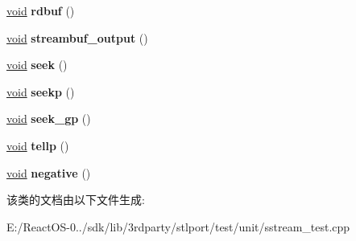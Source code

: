 \begin{DoxyCompactItemize}
\hyperlink{interfacevoid}{void} {\bfseries rdbuf} ()
\item 
\mbox{\label{class_sstream_test_ad43c3d1d6fd70e550c527dd25d0ab237}} 
\hyperlink{interfacevoid}{void} {\bfseries streambuf\+\_\+output} ()
\item 
\mbox{\label{class_sstream_test_a4669a4a5ed998c464d27375ba5d3dbf3}} 
\hyperlink{interfacevoid}{void} {\bfseries seek} ()
\item 
\mbox{\label{class_sstream_test_a20c153e7e18936dc217b8f9072799672}} 
\hyperlink{interfacevoid}{void} {\bfseries seekp} ()
\item 
\mbox{\label{class_sstream_test_ad62887f074432c60571739685bf7c849}} 
\hyperlink{interfacevoid}{void} {\bfseries seek\+\_\+gp} ()
\item 
\mbox{\label{class_sstream_test_a3e9ecb8f3905d9fa2805af7f1ef5c541}} 
\hyperlink{interfacevoid}{void} {\bfseries tellp} ()
\item 
\mbox{\label{class_sstream_test_a01369fcc022908f47fa6b27d45cce211}} 
\hyperlink{interfacevoid}{void} {\bfseries negative} ()
\end{DoxyCompactItemize}


该类的文档由以下文件生成\+:\begin{DoxyCompactItemize}
\item 
E\+:/\+React\+O\+S-\/0../sdk/lib/3rdparty/stlport/test/unit/sstream\+\_\+test.\+cpp\end{DoxyCompactItemize}
